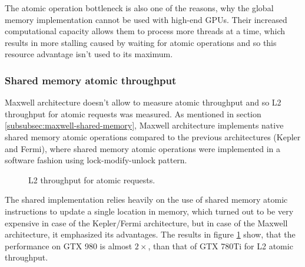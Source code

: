 The atomic operation bottleneck is also one of the reasons, why the global memory implementation cannot be used with high-end GPUs. Their increased computational capacity allows them to process more threads at a time, which results in more stalling caused by waiting for atomic operations and so this resource advantage isn't used to its maximum.

\subsubsection{Shared memory atomic throughput}\label{subsubsec:prof-thr-shared-memory}

Maxwell architecture doesn't allow to measure atomic throughput and so L2 throughput for atomic requests was measured. As mentioned in section \ref{subsubsec:maxwell-shared-memory}, Maxwell architecture implements native shared memory atomic operations compared to the previous architectures (Kepler and Fermi), where shared memory atomic operations were implemented in a software fashion using lock-modify-unlock pattern.

\begin{figure}[ht]
\centering{}
	\caption{L2 throughput for atomic requests.}
		\label{fig:l2-atomic-shared}
\end{figure}

The shared implementation relies heavily on the use of shared memory atomic instructions to update a single location in memory, which turned out to be very expensive in case of the Kepler/Fermi architecture, but in case of the Maxwell architecture, it emphasized its advantages. The results in figure \ref{fig:l2-atomic-shared} show, that the performance on GTX 980 is almost $2\times$, than that of GTX 780Ti for L2 atomic throughput.

